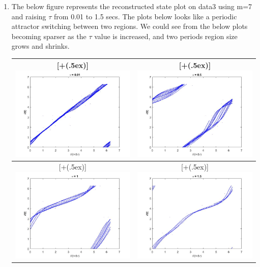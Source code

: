 \documentclass{article}
\newcommand*{\addheight}[2][.5ex]{%
  \raisebox{0pt}[\dimexpr\height+(#1)\relax]{#2}%
}
\begin{document}
\begin{enumerate}[label=(\alph*)]
\item
The below figure represents the reconstructed state plot on data3 using m=7 and raising $\tau$ from 0.01 to 1.5 secs. The plots below looks like a periodic attractor switching between two regions. We could see from the below plots becoming sparser as the $\tau$ value is increased, and two periods region size grows and shrinks. \\
\begin{minipage}{\linewidth}
{
\begin{table}[H]
\centering
\begin{tabular}{|c|c|}
	\hline
	\addheight{\includegraphics[width=75mm]{images/prob2b1.jpg}} &
    \addheight{\includegraphics[width=75mm]{images/prob2b2.jpg}} \\
    \hline
    \addheight{\includegraphics[width=75mm]{images/prob2b3.jpg}} &
    \addheight{\includegraphics[width=75mm]{images/prob2b4.jpg}} \\

\end{tabular}
\end{table}}
\end{minipage}
\end{enumerate}
\end{document}
